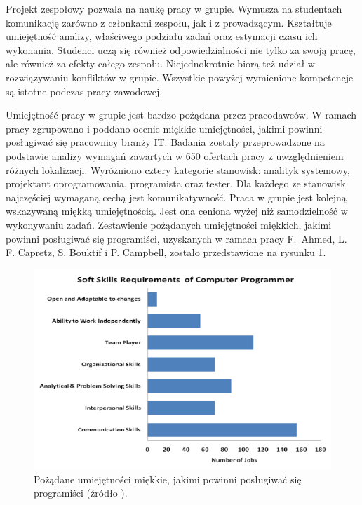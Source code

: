 Projekt zespołowy pozwala na naukę pracy w grupie.
Wymusza na studentach komunikację zarówno z członkami zespołu, jak i z prowadzącym.
Kształtuje umiejętność analizy, właściwego podziału zadań oraz estymacji czasu ich wykonania.
Studenci uczą się również odpowiedzialności nie tylko za swoją pracę, ale również za efekty całego zespołu.
Niejednokrotnie biorą też udział w rozwiązywaniu konfliktów w grupie.
Wszystkie powyżej wymienione kompetencje są istotne podczas pracy zawodowej.


Umiejętność pracy w grupie jest bardzo pożądana przez pracodawców.
W ramach pracy \cite{soft-skills} zgrupowano i poddano ocenie miękkie umiejętności, jakimi powinni posługiwać się pracownicy branży IT.
Badania zostały przeprowadzone na podstawie analizy wymagań zawartych w 650 ofertach pracy z uwzględnieniem różnych lokalizacji.
Wyróżniono cztery kategorie stanowisk: analityk systemowy, projektant oprogramowania, programista oraz tester.
Dla każdego ze stanowisk najczęściej wymaganą cechą jest komunikatywność.
Praca w grupie jest kolejną wskazywaną miękką umiejętnością.
Jest ona ceniona wyżej niż samodzielność w wykonywaniu zadań.
Zestawienie pożądanych umiejętności miękkich, jakimi powinni posługiwać się programiści, uzyskanych w ramach pracy F.~Ahmed, L. F. Capretz, S. Bouktif i P. Campbell, zostało przedstawione na rysunku \ref{fig:soft-skills}.

\begin{figure}[h]
    \centering
    \includegraphics[width = 13cm]{chapter02/soft-skills.png}
    \caption{Pożądane umiejętności miękkie, jakimi powinni posługiwać się programiści (źródło \cite{soft-skills}).}
    \label{fig:soft-skills}
\end{figure}

